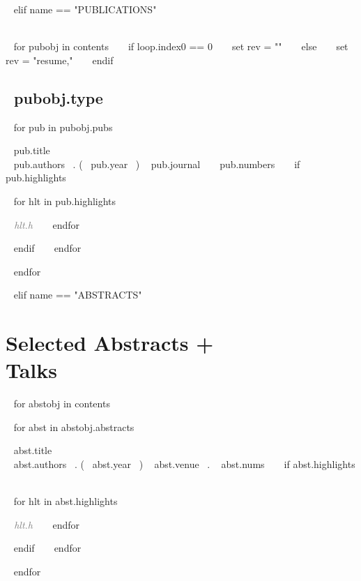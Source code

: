 ~{ elif name == "PUBLICATIONS" }~

\needspace{\headerpush}
\myRule{\columnwidth}{1pt}\\

~{ for pubobj in contents }~ 
~{ if loop.index0 == 0 }~ 
	~{ set rev = "" }~
~{ else }~
	~{ set rev = "resume," }~
~{ endif }~
\subsection{~{{pubobj.type}}~} 
\begin{etaremune}[~{{ rev }}~itemindent=-1.5\bibhang, topsep=0pt,
				   itemsep=\bibsep,partopsep=0pt,parsep=0pt,leftmargin={\bibhang+\widthof{[999]}}] 
    ~{ for pub in pubobj.pubs  }~
    \item ~{{ pub.title }}~ \\
     ~{{ pub.authors }}~. (~{{ pub.year }}~) ~{{ pub.journal }}~ ~{{ pub.numbers }}~
     ~{ if pub.highlights }~
     	\begin{innerlist}
     	~{ for hlt in pub.highlights }~
	     \item  \textcolor{grey}{\textit{~{{ hlt.h }}~} }
     	~{ endfor }~
     	\end{innerlist}
     ~{ endif }~
	~{ endfor }~

\end{etaremune}

~{ endfor }~





~{ elif name == "ABSTRACTS" }~

\section{Selected Abstracts +  \\Talks}

~{ for abstobj in contents }~ 
\begin{etaremune}[itemindent=-1.5\bibhang, topsep=0pt,
				   itemsep=\bibsep,partopsep=0pt,parsep=0pt,leftmargin={\bibhang+\widthof{[999]}}] 
    ~{ for abst in abstobj.abstracts  }~
    \item ~{{ abst.title }}~\\ ~{{ abst.authors }}~. (~{{ abst.year }}~) ~{{ abst.venue }}~. ~{{ abst.nums }}~
     ~{ if abst.highlights }~
     	\begin{innerlist}
     	~{ for hlt in abst.highlights }~
	     \item  \textcolor{grey}{\textit{~{{ hlt.h }}~} }
     	~{ endfor }~
     	\end{innerlist}
     ~{ endif }~
	~{ endfor }~


\end{etaremune}
~{ endfor }~




